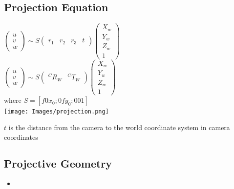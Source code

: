 \subsection*{Projection Equation}
$\begin{pmatrix} u\\ v\\ w\end{pmatrix} \sim
S \begin{pmatrix}r_1 & r_2 & r_3 & t \end{pmatrix}
\begin{pmatrix} X_w \\ Y_w \\ Z_w \\ 1\end{pmatrix}$ \\
$\begin{pmatrix} u\\ v\\ w\end{pmatrix} \sim
S \begin{pmatrix} ^C R_W & ^C T_W \end{pmatrix}
\begin{pmatrix} X_w \\ Y_w \\ Z_w \\ 1\end{pmatrix}$ \\
where $S = [f 0 x_0; 0 f y_0; 0 0 1]$\\
\texttt{[image: Images/projection.png]}

\alert{$t$ is the distance from the camera to the world coordinate
system in camera coordinates}

\subsection*{Projective Geometry}
\begin{itemize}
  \item 
\end{itemize}


